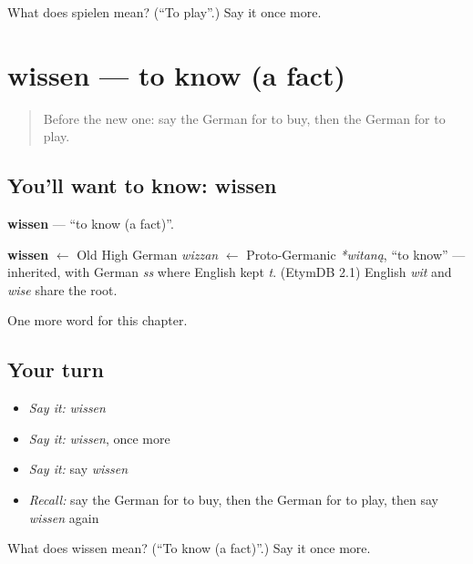 \begin{tcolorbox}[breakable,colback=teal!4,colframe=teal!35!black,title={Before you move on}]
What does spielen mean? (\textquotedblleft{}To play\textquotedblright{}.) Say it once more.
\end{tcolorbox}
\section[wissen]{wissen — to know (a fact)}

\label{lesson:GE-C64-wissen}



\begin{quote}
Before the new one: say the German for to buy, then the German for to play.
\end{quote}

\subsection*{You'll want to know: wissen}
\textbf{wissen} — \textquotedblleft{}to know (a fact)\textquotedblright{}.

\begin{cousinweb}
\textbf{wissen} $\leftarrow$ Old High German \emph{wizzan} $\leftarrow$ Proto-Germanic \emph{*witaną}, \textquotedblleft{}to know\textquotedblright{} — inherited, with German \emph{ss} where English kept \emph{t}. (EtymDB 2.1) English \emph{wit} and \emph{wise} share the root.
\end{cousinweb}

\begin{grammarlens}[title={What you've built}]
One more word for this chapter.
\end{grammarlens}

\subsection*{Your turn}
\begin{itemize}
\raggedright
  \item \emph{Say it:} \emph{wissen}
  \item \emph{Say it:} \emph{wissen}, once more
  \item \emph{Say it:} say \emph{wissen}
  \item \emph{Recall:} say the German for to buy, then the German for to play, then say \emph{wissen} again
\end{itemize}

\begin{tcolorbox}[breakable,colback=teal!4,colframe=teal!35!black,title={Before you move on}]
What does wissen mean? (\textquotedblleft{}To know (a fact)\textquotedblright{}.) Say it once more.
\end{tcolorbox}
